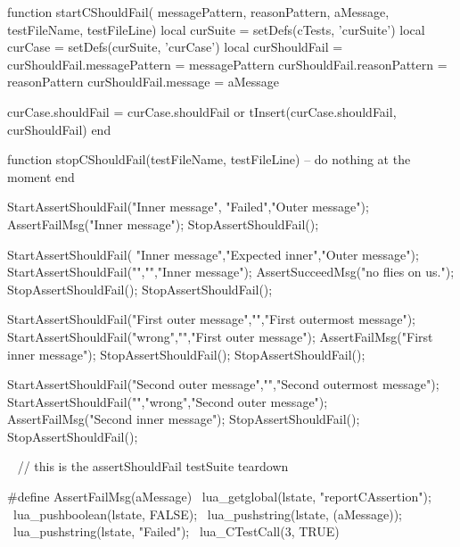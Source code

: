 \startLuaCode
function startCShouldFail(
  messagePattern, reasonPattern, aMessage,
  testFileName, testFileLine)
  local curSuite     = setDefs(cTests, 'curSuite')
  local curCase      = setDefs(curSuite, 'curCase')
  local curShouldFail   = { }
  curShouldFail.messagePattern = messagePattern
  curShouldFail.reasonPattern  = reasonPattern
  curShouldFail.message        = aMessage
  
  curCase.shouldFail = curCase.shouldFail or { }
  tInsert(curCase.shouldFail, curShouldFail)
end

function stopCShouldFail(testFileName, testFileLine)
  -- do nothing at the moment
end
\stopLuaCode


\startCTest
StartAssertShouldFail("Inner message", "Failed","Outer message");
  AssertFailMsg("Inner message");
StopAssertShouldFail();
\stopCTest
\stopTestCase


\startCTest
StartAssertShouldFail(
  "Inner message","Expected inner","Outer message");
  StartAssertShouldFail("","","Inner message");
    AssertSucceedMsg("no flies on us.");
  StopAssertShouldFail();
StopAssertShouldFail();
\stopCTest
\stopTestCase


\startCTest
StartAssertShouldFail("First outer message","","First outermost message");
StartAssertShouldFail("wrong","","First outer message");
  AssertFailMsg("First inner message");
StopAssertShouldFail();
StopAssertShouldFail();

StartAssertShouldFail("Second outer message","","Second outermost message");
StartAssertShouldFail("","wrong","Second outer message");
  AssertFailMsg("Second inner message");
StopAssertShouldFail();
StopAssertShouldFail();
\stopCTest
\stopTestCase

\CTestSuiteTeardown\
\startCTest
  // this is the assertShouldFail testSuite teardown
\stopCTest

\stopTestSuite

\startTestSuite[assertFail]

\startCHeader
#define AssertFailMsg(aMessage)              \
  lua_getglobal(lstate, "reportCAssertion"); \
  lua_pushboolean(lstate, FALSE);            \
  lua_pushstring(lstate, (aMessage));        \
  lua_pushstring(lstate, "Failed");          \
  lua_CTestCall(3, TRUE)
  
